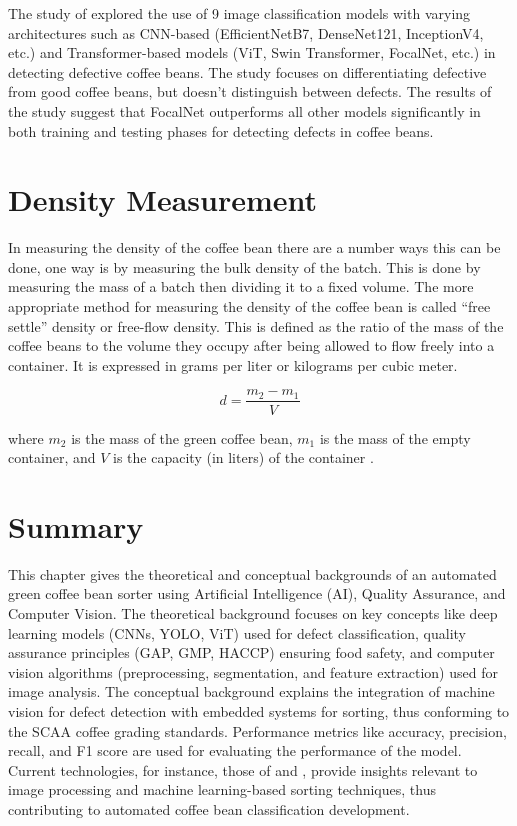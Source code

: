 The study of \cite{Muchtar_Hafifah_Febriana_Dawood_Ahmadiar_Bahri_Lin_Yohannes_2025} explored the use of 9 image classification models with varying architectures such as CNN-based (EfficientNetB7, DenseNet121, InceptionV4, etc.)  and Transformer-based models (ViT, Swin Transformer, FocalNet, etc.) in detecting defective coffee beans. The study focuses on differentiating defective from good coffee beans, but doesn’t distinguish between defects. The results of the study suggest that FocalNet outperforms all other models significantly in both training and testing phases for detecting defects in coffee beans.


\section{Density Measurement}
In measuring the density of the coffee bean there are a number ways this can be done, one way is by measuring the bulk density of the batch. This is done by measuring the mass of a batch then dividing it to a fixed volume. The more appropriate method for measuring the density of the coffee bean is called “free settle” density or free-flow density. This is defined as the ratio of the mass of the coffee beans to the volume they occupy after being allowed to flow freely into a container. It is expressed in grams per liter or kilograms per cubic meter. 

\begin{equation}
	d = \frac{m_2-m_1}{V}
\end{equation}

where $m_2$ is the mass of the green coffee bean, $m_1$ is the mass of the empty container, and $V$ is the capacity (in liters) of the container \cite{International_Organization_for_Standardization_1995}.

\section{Summary}
This chapter gives the theoretical and conceptual backgrounds of an automated green coffee bean sorter using Artificial Intelligence (AI), Quality Assurance, and Computer Vision. The theoretical background focuses on key concepts like deep learning models (CNNs, YOLO, ViT) used for defect classification, quality assurance principles (GAP, GMP, HACCP) ensuring food safety, and computer vision algorithms (preprocessing, segmentation, and feature extraction) used for image analysis. The conceptual background explains the integration of machine vision for defect detection with embedded systems for sorting, thus conforming to the SCAA coffee grading standards. Performance metrics like accuracy, precision, recall, and F1 score are used for evaluating the performance of the model. Current technologies, for instance, those of \cite{Lualhati_Mariano_Torres_Fenol_2022} and \cite{Balay_Cabrera_Jensen_Mayuga_2024}, provide insights relevant to image processing and machine learning-based sorting techniques, thus contributing to automated coffee bean classification development.

